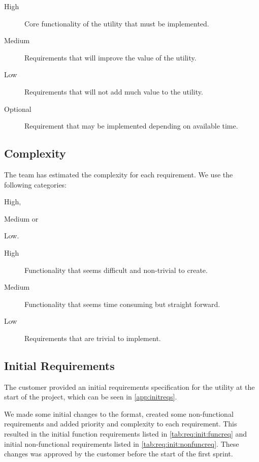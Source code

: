 \begin{description}
	\item[High] Core functionality of the \gls{utility} that must be implemented.
	\item[Medium] Requirements that will improve the value of the \gls{utility}.
	\item[Low] Requirements that will not add much value to the \gls{utility}.
	\item[Optional] Requirement that may be implemented depending on available time.
\end{description}

\subsection{Complexity}
\label{sec:req:compl}
The team has estimated the complexity for each requirement. We use the following categories:
\begin{inparaenum}
	\item High,
	\item Medium or
	\item Low.
\end{inparaenum}

\begin{description}
	\item[High] Functionality that seems difficult and non-trivial to create.
	\item[Medium] Functionality that seems time consuming but straight forward.
	\item[Low] Requirements that are trivial to implement.
\end{description}

\subsection{Initial Requirements}
The customer provided an initial requirements specification for the utility at
the start of the project, which can be seen in \autoref{app:initreqs}.

We made some initial changes to the format, created some non-functional
requirements and added priority and complexity to each requirement.
This resulted in the initial function requirements listed in
\autoref{tab:req:init:funcreq} and initial non-functional requirements listed
in \autoref{tab:req:init:nonfuncreq}.
These changes was approved by the customer before the start of the first
sprint.

